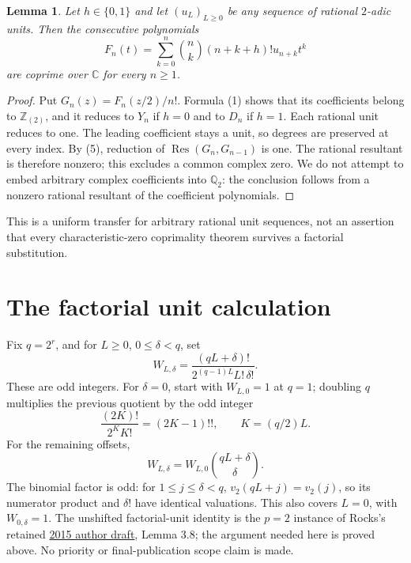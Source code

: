 \documentclass[11pt]{article}
\newtheorem{lemma}[theorem]{Lemma}
\begin{document}
\begin{lemma}\label{lem:units}
Let $h\in\{0,1\}$ and let $(u_L)_{L\ge0}$ be any sequence of rational
$2$-adic units. Then the consecutive polynomials
\[
 F_n(t)=\sum_{k=0}^n\binom nk(n+k+h)!u_{n+k}t^k
\]
are coprime over $\mathbb C$ for every $n\ge1$.
\end{lemma}
\begin{proof}
Put $G_n(z)=F_n(z/2)/n!$. Formula (1) shows that its coefficients
belong to $\mathbb Z_{(2)}$, and it reduces to $Y_n$ if $h=0$ and to
$D_n$ if $h=1$. Each rational unit reduces to one. The leading
coefficient stays a unit, so degrees are preserved at every index.
By (5), reduction of $\operatorname{Res}(G_n,G_{n-1})$ is one.
The rational resultant is therefore nonzero; this excludes a common
complex zero. We do not attempt to embed arbitrary complex coefficients
into $\mathbb Q_2$: the conclusion follows from a nonzero rational
resultant of the coefficient polynomials.
\end{proof}
This is a uniform transfer for arbitrary rational unit sequences,
not an assertion that every characteristic-zero coprimality theorem
survives a factorial substitution.

\section{The factorial unit calculation}
Fix $q=2^r$, and for $L\ge0$, $0\le\delta<q$, set
\[
 W_{L,\delta}=\frac{(qL+\delta)!}
                    {2^{(q-1)L}L!\,\delta!}.              \tag{6}
\]
These are odd integers. For $\delta=0$, start with
$W_{L,0}=1$ at $q=1$; doubling $q$ multiplies the previous quotient
by the odd integer
\[
             \frac{(2K)!}{2^K K!}=(2K-1)!!,
                     \qquad K=(q/2)L.
\]
For the remaining offsets,
\[
             W_{L,\delta}=W_{L,0}\binom{qL+\delta}{\delta}.
\]
The binomial factor is odd: for $1\le j\le\delta<q$,
$v_2(qL+j)=v_2(j)$, so its numerator product and $\delta!$ have
identical valuations. This also covers $L=0$, with $W_{0,\delta}=1$.
The unshifted factorial-unit identity is the $p=2$ instance of
Rocks's retained \href{sources/rocks-2015-author-preprint.pdf}{2015 author
draft}, Lemma 3.8; the argument needed here is proved above.
No priority or final-publication scope claim is made.
\end{document}
